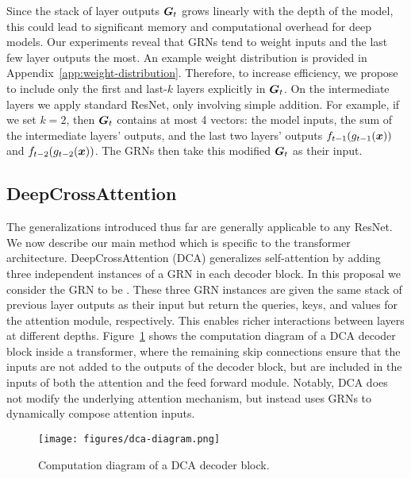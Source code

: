 
 Since the stack of layer outputs ${\bm{G}}_t$ grows linearly with the depth of the model, this could lead to significant memory and computational overhead for deep models. Our experiments reveal that GRNs tend to weight inputs and the last few layer outputs the most. An example weight distribution is provided in Appendix~\ref{app:weight-distribution}. Therefore, to increase efficiency, we propose to include only the first and last-$k$ layers explicitly in ${\bm{G}}_t$. On the intermediate layers we apply standard ResNet, only involving simple addition. For example, if we set $k=2$, then ${\bm{G}}_t$ contains at most 4 vectors: the model inputs, the sum of the intermediate layers' outputs, and the last two layers' outputs $f_{t-1}(g_{t-1}(\bm{x}))$ and $f_{t-2}(g_{t-2}(\bm{x}))$. The GRNs then take this modified ${\bm{G}}_t$ as their input.

\subsection{DeepCrossAttention}
\label{sec:deepcrossattention}

The generalizations introduced thus far are generally applicable to any ResNet. We now describe our main method which is specific to the transformer architecture. DeepCrossAttention (DCA) generalizes self-attention by adding three independent instances of a GRN in each decoder block. In this proposal we consider the GRN to be \GenC{}. These three GRN instances are given the same stack of previous layer outputs as their input but return the queries, keys, and values for the attention module, respectively. This enables richer interactions between layers at different depths.
Figure~\ref{fig:dca-diagram} shows the computation diagram of a DCA decoder block inside a transformer, where
the remaining skip connections ensure that the inputs are not added to the outputs of the decoder block, but are included in the inputs of both the attention and the feed forward module. 
Notably, DCA does not modify the underlying attention mechanism, but instead uses GRNs to dynamically compose attention inputs.

\begin{figure}[t!]
    \centering
    \texttt{[image: figures/dca-diagram.png]}
    \vskip -0.1in
    \caption{Computation diagram of a DCA decoder block.}
    \label{fig:dca-diagram}
\end{figure}

